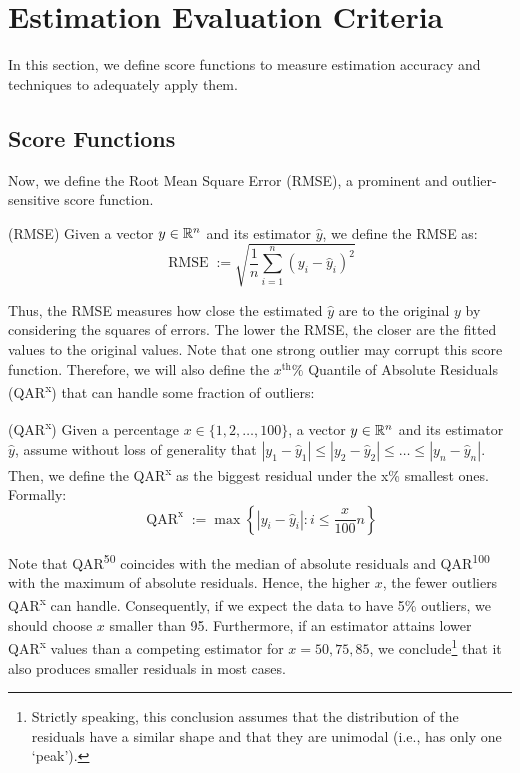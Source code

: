 \section{Estimation Evaluation Criteria}{ \label{sec:general_methods}
	In this section, we define score functions to measure estimation accuracy and techniques to adequately apply them. 

	\subsection{Score Functions}\label{sec:scorefun}
	    Now, we define the Root Mean Square Error (RMSE), a prominent and outlier-sensitive score function.
	    \begin{definition}(RMSE)\label{def:rmse}
		Given a vector $y\in \mathbb{R}^n$ and its estimator $\hat y$, we define the RMSE as:
		\begin{equation}
			\label{eq:rmse}
			 \operatorname{RMSE}:=\sqrt{\frac{1}{n}\sum_{i=1}^n (y_i - \hat y_i)^2}
		\end{equation}
		\end{definition}
		Thus, the RMSE measures how close the estimated $\hat y$ are to the original $y$ by considering the squares of errors. The lower the RMSE, the closer are the fitted values to the original values. Note that one strong outlier may corrupt this score function. Therefore, we will also define the $x^\text{th}\%$ Quantile of Absolute Residuals (QAR\textsuperscript{x}) that can handle some fraction of outliers:
		\begin{definition} (QAR\textsuperscript{x}) \label{def:qar}
		    Given a percentage $x\in \{1,2,\dots,100\}$, a vector $y\in \mathbb{R}^n$ and its estimator $\hat y$, assume without loss of generality that $|y_1-\hat y_1|\leq |y_2-\hat y_2|\leq \dots \leq |y_n-\hat y_n|$. Then, we define the QAR\textsuperscript{x} as the biggest residual under the x\% smallest ones. Formally:  
		    \begin{equation}
		        \operatorname{QAR}^{\text{x}}:=\max \left\{|y_i-\hat y_i|:i\leq \frac{x}{100}n \right\}
		    \end{equation}
		\end{definition}
		Note that QAR\textsuperscript{50} coincides with the median of absolute residuals and QAR\textsuperscript{100} with the maximum of absolute residuals. Hence, the higher $x$, the fewer outliers QAR\textsuperscript{x} can handle. Consequently, if we expect the data to have 5\% outliers, we should choose $x$ smaller than 95. Furthermore, if an estimator attains lower QAR\textsuperscript{x} values than a competing estimator for $x=50,75,85$, we conclude\footnote{Strictly speaking, this conclusion assumes that the distribution of the residuals have a similar shape and that they are unimodal (i.e., has only one `peak').} that it also produces smaller residuals in most cases.  
		
}

